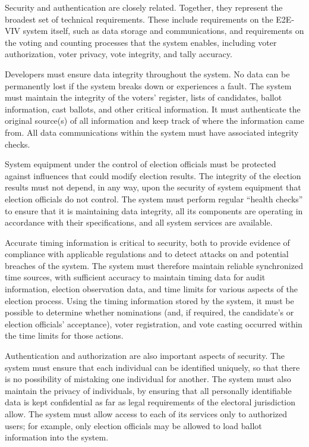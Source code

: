 Security and authentication are closely related. Together, they
represent the broadest set of technical requirements. These include
requirements on the E2E-VIV system itself, such as data storage and
communications, and requirements on the voting and counting processes
that the system enables, including voter authorization, voter privacy,
vote integrity, and tally accuracy.

Developers must ensure data integrity throughout the system.  No data
can be permanently lost if the system breaks down or experiences a
fault. The system must maintain the integrity of the voters' register,
lists of candidates, ballot information, cast ballots, and other
critical information. It must authenticate the original source(s) of
all information and keep track of where the information came from. All
data communications within the system must have associated integrity
checks.

System equipment under the control of election officials must be
protected against influences that could modify election results. The
integrity of the election results must not depend, in any way, upon
the security of system equipment that election officials do not
control. The system must perform regular ``health checks'' to ensure
that it is maintaining data integrity, all its components are
operating in accordance with their specifications, and all system
services are available.

Accurate timing information is critical to security, both to provide
evidence of compliance with applicable regulations and to detect
attacks on and potential breaches of the system. The system must
therefore maintain reliable synchronized time sources, with sufficient
accuracy to maintain timing data for audit information, election
observation data, and time limits for various aspects of the election
process. Using the timing information stored by the system, it must be
possible to determine whether nominations (and, if required, the
candidate's or election officials' acceptance), voter registration,
and vote casting occurred within the time limits for those actions.

Authentication and authorization are also important aspects of
security. The system must ensure that each individual can be
identified uniquely, so that there is no possibility of mistaking one
individual for another. The system must also maintain the privacy of
individuals, by ensuring that all personally identifiable data is kept
confidential as far as legal requirements of the electoral
jurisdiction allow. The system must allow access to each of its
services only to authorized users; for example, only election
officials may be allowed to load ballot information into the system.


